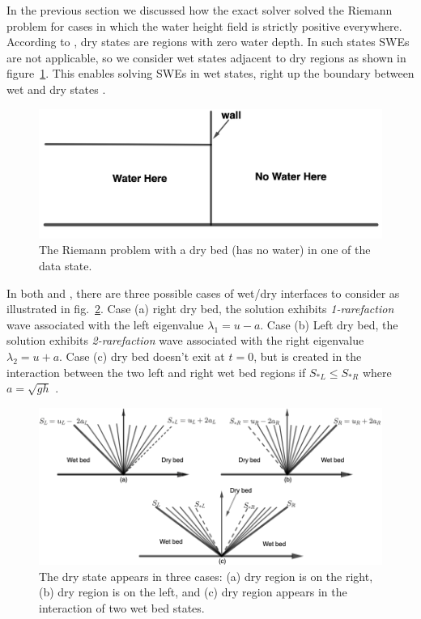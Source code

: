 \documentclass[11pt,a4paper]{article}
\begin{document}
	In the previous section we discussed how the exact solver solved the Riemann problem for cases in which the water height field is strictly positive everywhere. According to \citet{toro2001shock}, dry states are regions with zero water depth. In such states SWEs are not applicable, so we consider wet states adjacent to dry regions as shown in figure~\ref{fig:dry-bed}. This enables solving SWEs in wet states, right up the boundary between wet and dry states  \cite{le-ge-be:2011}.
	\begin{figure}[H]
		\centering
		\includegraphics[width=0.5\linewidth]{images/dd1}
		\caption{ The Riemann problem with a dry bed (has no water) in one of the data state.}
		\label{fig:dry-bed}
	\end{figure}
	In both \citet{barzgaran2019numerical} and \citet{toro2001shock}, there are three possible cases of wet/dry interfaces to consider as illustrated in fig.~\ref{fig:dry-wet}. Case (a) right dry bed, the solution exhibits {\em 1-rarefaction} wave associated with the left eigenvalue $\lambda_1 = u - a$. Case (b) Left dry bed, the solution exhibits {\em 2-rarefaction} wave associated with the right eigenvalue $\lambda_2 = u + a$. Case (c) dry bed doesn't exit at $t=0$, but is created in the interaction between the two left and right wet bed regions if $S_{*L} \le S_{*R}$ where $a = \sqrt{gh}$  \cite{le-ge-be:2011}.
	
	
	
	
	\begin{figure}[H]
		\centering
		\includegraphics[width=0.7\linewidth]{images/dry-wet}
		\caption{The dry state appears in three cases: (a) dry region is on the right, (b) dry region is on the left, and (c) dry region appears in the interaction of two wet bed states.}
		\label{fig:dry-wet}
	\end{figure}
	
\end{document}
